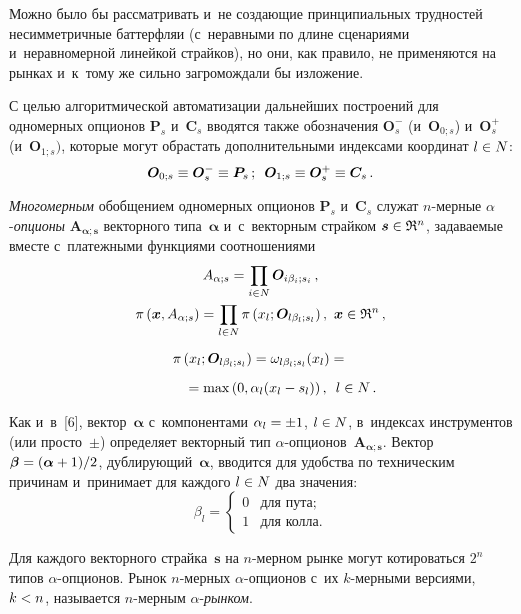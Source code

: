 \begin{multicols}{2}
  Можно было бы рассматривать и~не создающие принципиальных трудностей 
несимметричные баттерфляи (с~неравными по длине сценариями 
и~неравномерной линейкой страйков), но они, как правило, не применяются на 
рынках и~к~тому же сильно загромождали бы изложение. 
  
  С целью алгоритмической автоматизации дальнейших построений для 
одномерных опционов $\bm{P}_s$ и~$\bm{C}_s$ вводятся также обозначения 
$\bm{O}_s^-$ (и~$\bm{O}_{0;s}$) и~$\bm{O}_s^+$ (и~$\bm{O}_{1;s})$, которые 
могут обрастать дополнительными индексами координат $l\hm\in N$: 
  \begin{equation}
  \bm{O}_{0;s}\equiv \bm{O}_s^- \equiv \bm{P}_s\,;\enskip
  \bm{O}_{1;s} \equiv \bm{O}_s^+\equiv \bm{C}_s\,.
  \label{e8-aga}
  \end{equation}
  
  \textit{Многомерным} обобщением одномерных опционов $\bm{P}_s$ 
и~$\bm{C}_s$ служат $n$-мер\-ные $\alpha$-\textit{оп\-ци\-оны} 
$\bm{A}_{\bm{\alpha};\bm{s}}$ векторного типа~$\bm{\alpha}$ и~с~векторным 
страйком $\bm{s}\hm \in \mathfrak{R}^n$, задаваемые вместе с~платежными 
функциями соотношениями 
  \begin{multline}
  {A}_{\alpha;s}=\prod\limits_{i\in N} \bm{O}_{i\beta_i;s_i}\,,\\
  \pi\left(\bm{x}, A_{\alpha;s}\right)=
  \prod_{l\in N}\pi \left(x_l; \bm{O}_{l\beta_l;s_l}\right),\ \bm{x}\in 
\mathfrak{R}^n\,,\\[6pt]
  \pi\left( x_l; \bm{O}_{l\beta_l;s_l}\right) =\omega_{l\beta_l;s_l}(x_l)={}\\[6pt]
  \hspace*{10mm}{}=\max  \left(0,\alpha_l (x_l-s_l)\right), \enskip l\in N\,.
    \label{e9-aga}
  \end{multline}
  
  Как и~в~[6], вектор~$\bm{\alpha}$ с~компонентами $\alpha_l\hm= \pm1$, $l\hm\in N$, 
в~индексах инструментов (или просто~$\pm$) определяет векторный тип  
$\alpha$-оп\-ци\-онов~$\bm{A}_{\bm{\alpha};\bm{s}}$. Вектор $\bm{\beta}\hm= 
(\bm{\alpha}\hm+1)/2$, дублирующий~$\bm{\alpha}$, вводится для удобства по 
техническим причинам и~принимает для каждого $l\hm\in N$ два значения: 
$$
\beta_l= \begin{cases}
0 &\mbox{для\ пута;}\\ 
1 & \mbox{для\ колла.}
\end{cases}
$$ 
  
  Для каждого векторного страйка~$\bm{s}$ на $n$-мер\-ном рынке могут 
котироваться $2^n$ типов $\alpha$-оп\-ци\-онов. Рынок $n$-мер\-ных  
$\alpha$-оп\-ци\-онов с~их $k$-мер\-ны\-ми версиями, $k\hm< n$, называется  
$n$-мер\-ным $\alpha$-\textit{рын\-ком}. 
  

\end{multicols}
